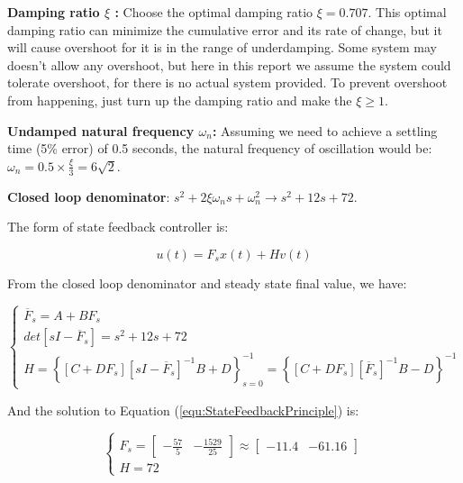 \documentclass[12pt, oneside]{article}
\begin{document}
 \textbf{Damping ratio $\xi$ :} Choose the optimal damping ratio $\xi=0.707$. This optimal damping ratio can minimize the cumulative error and its rate of change, but it will cause overshoot for it is in the range of underdamping. Some system may doesn't allow any overshoot, but here in this report we assume the system could tolerate overshoot, for there is no actual system provided. To prevent overshoot from happening, just turn up the damping ratio and make the $\xi \ge 1$.
 
 \textbf{Undamped natural frequency $\omega_n$:} Assuming we need to achieve a settling time (5\% error) of 0.5 seconds, the natural frequency of oscillation would be: $\omega_n = 0.5\times\frac{\xi}{3}=6\sqrt{2}.$

 \textbf{Closed loop denominator}: $s^2+2\xi\omega_{n}s+\omega_{n}^2 \rightarrow s^2+12s+72$.

The form of state feedback controller is:

\begin{equation}
    u(t) = F_{s}x(t)+Hv(t)
\end{equation}

 From the closed loop denominator and steady state final value, we have:

\begin{equation}
    \begin{cases}
        \overline{F}_s = A+BF_s\\
        det\left[sI-\overline{F}_s\right] = s^2+12s+72\\
        H = \left\{ \left[C+DF_s\right]\left[sI-\overline{F}_s\right]^{-1}B+D \right\}_{s=0}^{-1} = \left\{ \left[C+DF_s\right]\left[\overline{F}_s\right]^{-1}B-D \right\}^{-1}
    \end{cases}
    \label{equ:StateFeedbackPrinciple}
\end{equation}

And the solution to Equation (\ref{equ:StateFeedbackPrinciple}) is:
 
 \begin{equation}
     \begin{cases}
         F_s = \left[\begin{array}{ccc}-\frac{57}{5}&-\frac{1529}{25}\end{array}\right]\approx\left[\begin{array}{ccc}-11.4&-61.16\end{array}\right]\\
         H=72
     \end{cases}
 \end{equation}
\end{document}
